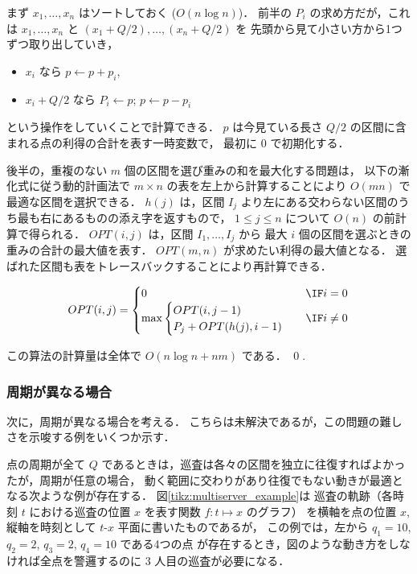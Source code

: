 まず $x_1, \ldots, x_n$ はソートしておく ($O(n \log n)$)．
前半の $P_i$ の求め方だが，これは
$x_1, \ldots, x_n$ と $(x_1 + Q/2), \ldots, (x_n + Q/2)$ を
先頭から見て小さい方から1つずつ取り出していき，
\begin{itemize}
	\item $x_i$ なら $p \gets p + p_i$, 
	\item $x_i + Q/2$ なら $P_i \gets p$; $p \gets p - p_i$
\end{itemize}
という操作をしていくことで計算できる．
$p$ は今見ている長さ $Q/2$ の区間に含まれる点の利得の合計を表す一時変数で， 最初に $0$ で初期化する．



後半の，重複のない $m$ 個の区間を選び重みの和を最大化する問題は，
以下の漸化式に従う動的計画法で
$m \times n$ の表を左上から計算することにより $O(mn)$ で
最適な区間を選択できる．
$h(j)$ は，区間 $I_j$ より左にある交わらない区間のうち最も右にあるものの添え字を返すもので，
$1 \leq j \leq n$ について $O(n)$ の前計算で得られる．
$OPT(i,j)$ は，区間 $I_1, \ldots, I_j$ から 最大 $i$ 個の区間を選ぶときの
重みの合計の最大値を表す．
$OPT(m,n)$ が求めたい利得の最大値となる．
選ばれた区間も表をトレースバックすることにより再計算できる．

\begin{equation}
	\label{eq:MultiplePatrolOnLine_DP}
	OPT(i,j) = 
	\begin{cases}
		0 & \IF i = 0 \\
		\max
		\begin{cases}
			OPT(i,j - 1) \\
			P_j + OPT(h(j), i - 1)
		\end{cases}
		 & \IF i \neq 0 \\
	\end{cases}
\end{equation}

この算法の計算量は全体で $O(n \log n + nm)$ である．
\qed {}.




\subsubsection{周期が異なる場合}

次に，周期が異なる場合を考える．
こちらは未解決であるが，この問題の難しさを示唆する例をいくつか示す．

点の周期が全て $Q$ であるときは，巡査は各々の区間を独立に往復すればよかったが，周期が任意の場合，
動く範囲に交わりがあり往復でもない動きが最適となる次ような例が存在する．
図\ref{tikz:multiserver_example}は
巡査の軌跡（各時刻 $t$ における巡査の位置 $x$ を表す関数 $f : t \mapsto x$ のグラフ）
を横軸を点の位置 $x$, 縦軸を時刻として $t$-$x$ 平面に書いたものであるが，
この例では，左から $q_1 = 10$, $q_2 = 2$, $q_3 = 2$, $q_4 = 10$ である4つの点
が存在するとき，図のような動き方をしなければ全点を警邏するのに $3$ 人目の巡査が必要になる．

